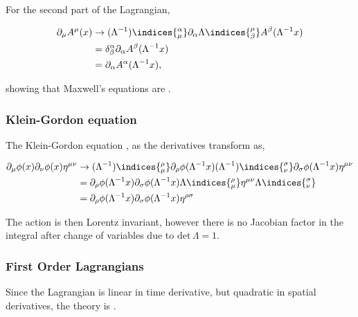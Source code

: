 For the second part of the Lagrangian,
\begin{derivation}
  \begin{equation}
    \begin{aligned}
      \partial_\mu A^\mu(x) &\rightarrow (\Lambda^{-1})\indices{^\alpha_\mu}\partial_\alpha \Lambda\indices{^\mu_\beta}A^\beta(\Lambda^{-1}x)\\
                           &= \delta^\alpha_\beta\partial_\alpha A^\beta(\Lambda^{-1}x)\\
                           &= \partial_\alpha A^\alpha(\Lambda^{-1}x),
    \end{aligned}
  \end{equation}
\end{derivation}
showing that Maxwell's equations are .

\subsubsection{Klein-Gordon equation}
The Klein-Gordon equation , as the derivatives transform as,
\begin{derivation}
  \begin{equation}
    \begin{aligned}
      \partial_\mu \phi(x)\partial_\nu\phi(x)\eta^{\mu\nu} &\rightarrow (\Lambda^{-1})\indices{^\rho_\mu}\partial_\rho \phi(\Lambda^{-1}x)(\Lambda^{-1})\indices{^\sigma_\nu}\partial_\sigma\phi(\Lambda^{-1}x)\eta^{\mu\nu}\\
                                                           &= \partial_\rho \phi(\Lambda^{-1}x)\partial_\sigma\phi(\Lambda^{-1}x)\Lambda\indices{^\rho_\mu}\eta^{\mu\nu}\Lambda\indices{^\sigma_\nu}\\
                                                           &= \partial_\rho \phi(\Lambda^{-1}x)\partial_\sigma\phi(\Lambda^{-1}x)\eta^{\rho\sigma}
    \end{aligned}
  \end{equation}
\end{derivation}


The action is then Lorentz invariant, however there is no Jacobian factor in the integral after change of variables due to $\text{det}\,\Lambda=1$.
\subsubsection{First Order Lagrangians}
Since the Lagrangian is linear in time derivative, but quadratic in spatial derivatives, the theory is .

